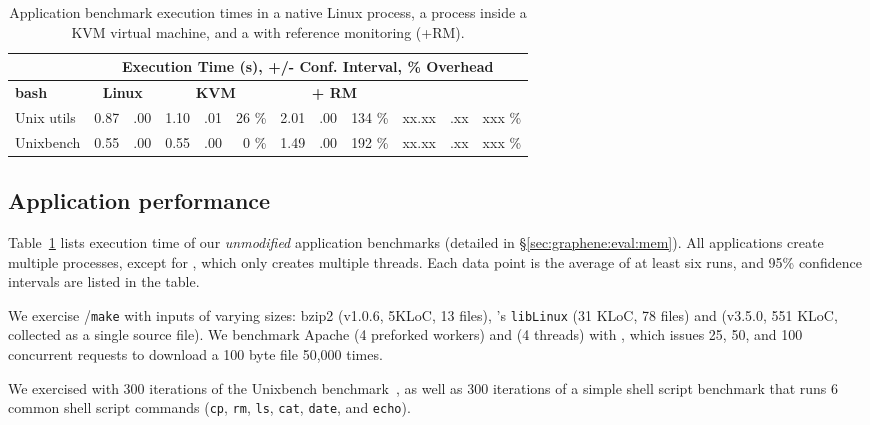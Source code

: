 \begin{table}[t!b!]
\begin{tabular}{|l|rr|rrr|rrr|rrr|}
\hline\hline

  & \multicolumn{11}{c|}{Execution Time (s), +/- Conf. Interval, \% Overhead} \\
\hline
{\bf bash } & \multicolumn{2}{c|}{\bf Linux} & \multicolumn{3}{c|}{{\bf KVM}} & \multicolumn{3}{c|}{{\bf \sysname{} + RM}} & \multicolumn{3}{c|}{{\bf \graphenesgx{}}} \\
\hline

Unix utils & 0.87 & .00 & 1.10 & .01 & 26 \% & 2.01 & .00 & 134 \% & xx.xx & .xx & xxx \% \\\hline
Unixbench  & 0.55 & .00 & 0.55 & .00 &  0 \% & 1.49 & .00 & 192 \% & xx.xx & .xx & xxx \% \\\hline
\end{tabular}
\caption[Application benchmark results in Linux, KVM and \sysname{}]
{Application benchmark execution times in a native Linux process, a process inside a KVM virtual machine, and a \sysname{} \picoproc{} with reference monitoring (+RM).  }
\label{tab:graphene:apps}
\end{table}


\subsection{Application performance}
\label{sec:graphene:eval:perf}

Table~\ref{tab:graphene:apps} lists 
execution time of our {\em unmodified} 
application benchmarks (detailed in \S\ref{sec:graphene:eval:mem}).
All applications create multiple processes,
except for \light{}, which only creates multiple threads.
Each data point is the average of at least six runs, 
and 95\% confidence intervals are listed in the table.

We exercise  {\tt \gcc{}}/{\tt make}
with inputs of varying sizes:
bzip2 (v1.0.6, 5KLoC, 13 files),
\sysname{}'s {\tt libLinux} (31 KLoC, 78 files)
and \gcc{} (v3.5.0, 551 KLoC, collected as a single source file). 
We benchmark Apache (4 preforked workers) and \light{} (4 threads) with 
\ab{},
which issues 25, 50, and 100 concurrent requests
to download a 100 byte file 50,000 times.

We exercised \busy{} with 
300 iterations of the Unixbench benchmark~\citep{unixbench}, as well as 
300 iterations of a simple shell script benchmark that runs 6 common shell script commands
({\tt cp}, {\tt rm}, {\tt ls}, {\tt cat}, {\tt date}, and {\tt echo}).

